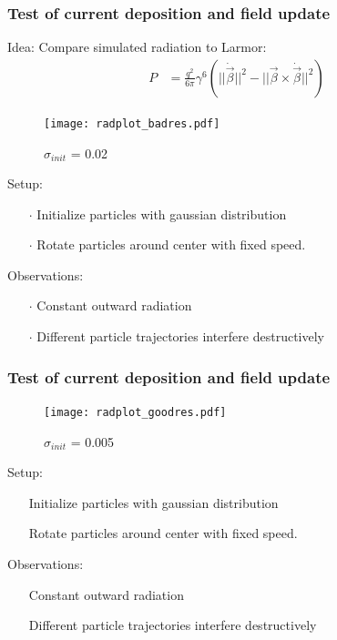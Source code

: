 \documentclass[5pt]{beamer}
\begin{document}
\begin{frame}
  
  \frametitle{Test of current deposition and field update}
  Idea: Compare simulated radiation to Larmor:
  \begin{align*}
    P &= \frac{q^2}{6\pi}\gamma^6(||\dot {\vec \beta}||^2 - ||\vec\beta \times \dot{\vec \beta}||^2)
  \end{align*}
  \begin{minipage}{0.45\textwidth}
    \centering
    \begin{figure}[h] 
      \centering
      \texttt{[image: radplot\_badres.pdf]}
      \caption{$\sigma_{init}$ = 0.02}
      \label{fig:bigvar}
    \end{figure}
  \end{minipage}
  \hfill
  \begin{minipage}{0.5\textwidth}
  
  Setup:
  \begin{itemize}
    \item[$\cdot$] Initialize particles with gaussian distribution
    \item[$\cdot$] Rotate particles around center with fixed speed.
  \end{itemize} 
  \pause
  Observations:
  \begin{itemize}
    \item[$\cdot$] Constant outward radiation
    \item[$\cdot$] Different particle trajectories interfere destructively
  \end{itemize}
\end{minipage}
\end{frame}
\begin{frame}
  \frametitle{Test of current deposition and field update}
  \begin{minipage}{0.45\textwidth}
    \begin{figure}[h]
      \centering
      \texttt{[image: radplot\_goodres.pdf]}
      \caption{$\sigma_{init}$ = 0.005}
      \label{fig:smallvar}
    \end{figure}
  \end{minipage}
  \hfill
  \begin{minipage}{0.5\textwidth}
  
  Setup:
  \begin{itemize}
    \item[\cdot] Initialize particles with gaussian distribution
    \item[\cdot] Rotate particles around center with fixed speed.
  \end{itemize} 
  Observations:
  \begin{itemize}
    \item[\cdot] Constant outward radiation
    \item[\cdot] Different particle trajectories interfere destructively
  \end{itemize}
\end{minipage}
\end{frame}
\end{document}
